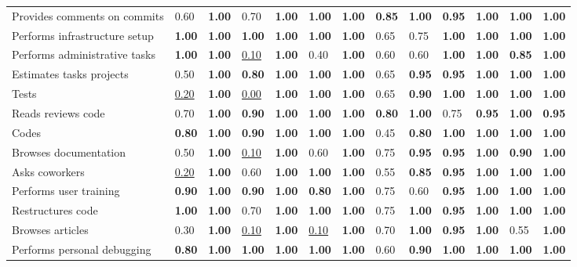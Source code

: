 \begin{tabular}{lllllllllllll}
Provides comments on commits & 0.60 & \textbf{1.00} & 0.70 & \textbf{1.00} & \textbf{1.00} & \textbf{1.00} & \textbf{0.85} & \textbf{1.00} & \textbf{0.95} & \textbf{1.00} & \textbf{1.00} & \textbf{1.00} \\
Performs infrastructure setup & \textbf{1.00} & \textbf{1.00} & \textbf{1.00} & \textbf{1.00} & \textbf{1.00} & \textbf{1.00} & 0.65 & 0.75 & \textbf{1.00} & \textbf{1.00} & \textbf{1.00} & \textbf{1.00} \\
Performs administrative tasks & \textbf{1.00} & \textbf{1.00} & \underline{0.10} & \textbf{1.00} & 0.40 & \textbf{1.00} & 0.60 & 0.60 & \textbf{1.00} & \textbf{1.00} & \textbf{0.85} & \textbf{1.00} \\
Estimates tasks projects & 0.50 & \textbf{1.00} & \textbf{0.80} & \textbf{1.00} & \textbf{1.00} & \textbf{1.00} & 0.65 & \textbf{0.95} & \textbf{0.95} & \textbf{1.00} & \textbf{1.00} & \textbf{1.00} \\
Tests & \underline{0.20} & \textbf{1.00} & \underline{0.00} & \textbf{1.00} & \textbf{1.00} & \textbf{1.00} & 0.65 & \textbf{0.90} & \textbf{1.00} & \textbf{1.00} & \textbf{1.00} & \textbf{1.00} \\
Reads reviews code & 0.70 & \textbf{1.00} & \textbf{0.90} & \textbf{1.00} & \textbf{1.00} & \textbf{1.00} & \textbf{0.80} & \textbf{1.00} & 0.75 & \textbf{0.95} & \textbf{1.00} & \textbf{0.95} \\
Codes & \textbf{0.80} & \textbf{1.00} & \textbf{0.90} & \textbf{1.00} & \textbf{1.00} & \textbf{1.00} & 0.45 & \textbf{0.80} & \textbf{1.00} & \textbf{1.00} & \textbf{1.00} & \textbf{1.00} \\
Browses documentation & 0.50 & \textbf{1.00} & \underline{0.10} & \textbf{1.00} & 0.60 & \textbf{1.00} & 0.75 & \textbf{0.95} & \textbf{0.95} & \textbf{1.00} & \textbf{0.90} & \textbf{1.00} \\
Asks coworkers & \underline{0.20} & \textbf{1.00} & 0.60 & \textbf{1.00} & \textbf{1.00} & \textbf{1.00} & 0.55 & \textbf{0.85} & \textbf{0.95} & \textbf{1.00} & \textbf{1.00} & \textbf{1.00} \\
Performs user training & \textbf{0.90} & \textbf{1.00} & \textbf{0.90} & \textbf{1.00} & \textbf{0.80} & \textbf{1.00} & 0.75 & 0.60 & \textbf{0.95} & \textbf{1.00} & \textbf{1.00} & \textbf{1.00} \\
Restructures code & \textbf{1.00} & \textbf{1.00} & 0.70 & \textbf{1.00} & \textbf{1.00} & \textbf{1.00} & 0.75 & \textbf{1.00} & \textbf{0.95} & \textbf{1.00} & \textbf{1.00} & \textbf{1.00} \\
Browses articles & 0.30 & \textbf{1.00} & \underline{0.10} & \textbf{1.00} & \underline{0.10} & \textbf{1.00} & 0.70 & \textbf{1.00} & \textbf{0.95} & \textbf{1.00} & 0.55 & \textbf{1.00} \\
Performs personal debugging & \textbf{0.80} & \textbf{1.00} & \textbf{1.00} & \textbf{1.00} & \textbf{1.00} & \textbf{1.00} & 0.60 & \textbf{0.90} & \textbf{1.00} & \textbf{1.00} & \textbf{1.00} & \textbf{1.00} \\
\bottomrule
\end{tabular}
